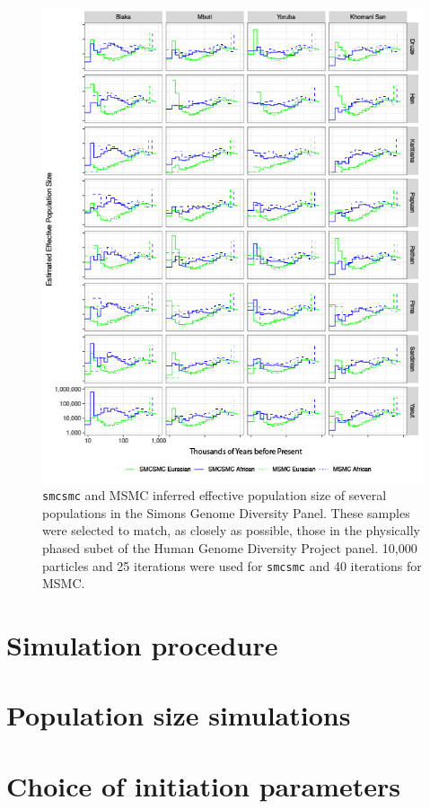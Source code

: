 \documentclass{article}
\begin{document}
\begin{figure}
    \centering
    \label{hgdp_sgdp_ne}
    \includegraphics[width=\linewidth]{../plot/sgdp_subset_ne.png}
    \caption{{\tt smcsmc} and MSMC inferred effective population size of several populations in the Simons Genome Diversity Panel. These samples were selected to match, as closely as possible, those in the physically phased subet of the Human Genome Diversity Project panel. 10,000 particles and 25 iterations were used for {\tt smcsmc} and 40 iterations for MSMC.}
    \label{fig:my_label}
\end{figure}

\section{Simulation procedure} \label{sim}
\section{Population size simulations} \label{ne}
\section{Choice of initiation parameters} \label{minit}
\end{document}
